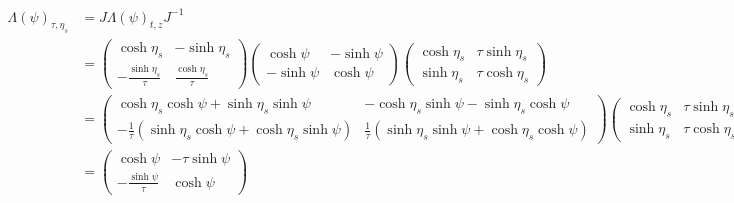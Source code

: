 \begin{subequations}
    \begin{align}
        \Lambda(\psi)_{\tau,\eta_s} & =J\Lambda(\psi)_{t,z}J^{-1} \\
                                    & =
        \begin{pmatrix}
            \cosh\eta_s               & -\sinh\eta_s             \\
            -\frac{\sinh\eta_s}{\tau} & \frac{\cosh\eta_s}{\tau}
        \end{pmatrix}
        \begin{pmatrix}
            \cosh\psi  & -\sinh\psi \\
            -\sinh\psi & \cosh\psi
        \end{pmatrix}
        \begin{pmatrix}
            \cosh\eta_s & \tau\sinh\eta_s \\
            \sinh\eta_s & \tau\cosh\eta_s
        \end{pmatrix}                                \\
                                    & =
        \begin{pmatrix}
            \cosh\eta_s\cosh\psi+\sinh\eta_s\sinh\psi                  & -\cosh\eta_s\sinh\psi-\sinh\eta_s\cosh\psi                \\
            -\frac{1}{\tau}(\sinh\eta_s\cosh\psi+\cosh\eta_s\sinh\psi) & \frac{1}{\tau}(\sinh\eta_s\sinh\psi+\cosh\eta_s\cosh\psi)
        \end{pmatrix}
        \begin{pmatrix}
            \cosh\eta_s & \tau\sinh\eta_s \\
            \sinh\eta_s & \tau\cosh\eta_s
        \end{pmatrix}                                \\
                                    & =
        \begin{pmatrix}
            \cosh\psi               & -\tau\sinh\psi \\
            -\frac{\sinh\psi}{\tau} & \cosh\psi
        \end{pmatrix}
    \end{align}
\end{subequations}

